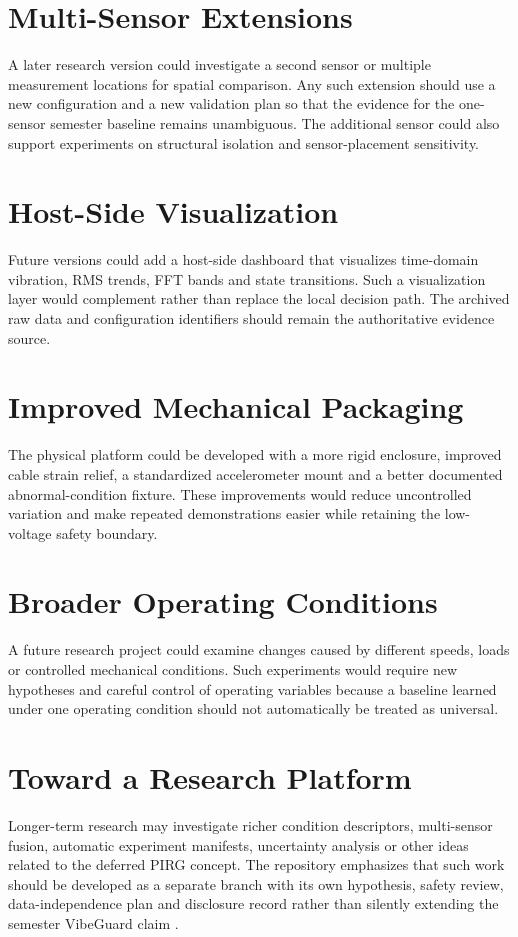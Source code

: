 \section{Multi-Sensor Extensions}
\hspace{2em}A later research version could investigate a second sensor or multiple measurement locations for spatial comparison. Any such extension should use a new configuration and a new validation plan so that the evidence for the one-sensor semester baseline remains unambiguous. The additional sensor could also support experiments on structural isolation and sensor-placement sensitivity.

\section{Host-Side Visualization}
\hspace{2em}Future versions could add a host-side dashboard that visualizes time-domain vibration, RMS trends, FFT bands and state transitions. Such a visualization layer would complement rather than replace the local decision path. The archived raw data and configuration identifiers should remain the authoritative evidence source.

\section{Improved Mechanical Packaging}
\hspace{2em}The physical platform could be developed with a more rigid enclosure, improved cable strain relief, a standardized accelerometer mount and a better documented abnormal-condition fixture. These improvements would reduce uncontrolled variation and make repeated demonstrations easier while retaining the low-voltage safety boundary.

\section{Broader Operating Conditions}
\hspace{2em}A future research project could examine changes caused by different speeds, loads or controlled mechanical conditions. Such experiments would require new hypotheses and careful control of operating variables because a baseline learned under one operating condition should not automatically be treated as universal.

\section{Toward a Research Platform}
\hspace{2em}Longer-term research may investigate richer condition descriptors, multi-sensor fusion, automatic experiment manifests, uncertainty analysis or other ideas related to the deferred PIRG concept. The repository emphasizes that such work should be developed as a separate branch with its own hypothesis, safety review, data-independence plan and disclosure record rather than silently extending the semester VibeGuard claim \cite{vibeguardprimer}.

